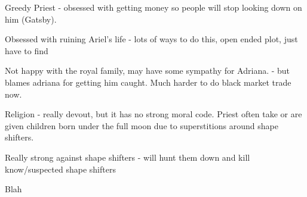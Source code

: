 \documentclass[char]{NeptuneBall}
\begin{document}
\name{\cUrchin{}}

Greedy Priest - obsessed with getting money so people will stop looking down on him (Gatsby).

Obsessed with ruining Ariel's life - lots of ways to do this, open ended plot, just have to find

Not happy with the royal family, may have some sympathy for Adriana. - but blames adriana for getting him caught. Much harder to do black market trade now.

Religion - really devout, but it has no strong moral code. Priest often take or are given children born under the full moon due to superstitions around shape shifters.

Really strong against shape shifters - will hunt them down and kill know/suspected shape shifters


\begin{itemz}[Goals]
  \item Blah
\end{itemz}

\begin{contacts}
  \contact{}
\end{contacts}
\end{document}
